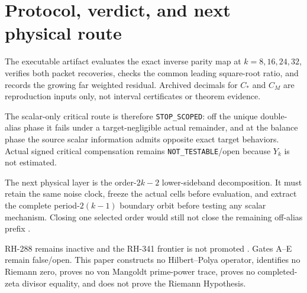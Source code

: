 \documentclass[11pt]{article}
\theoremstyle{remark}
\begin{document}
\section{Protocol, verdict, and next physical route}

The executable artifact evaluates the exact inverse parity map at
$k=8,16,24,32$, verifies both packet recoveries, checks the common leading
square-root ratio, and records the growing far weighted residual.  Archived
decimals for $C_*$ and $C_M$ are reproduction inputs only, not interval
certificates or theorem evidence.

The scalar-only critical route is therefore \texttt{STOP\_SCOPED}: off the
unique double-alias phase it fails under a target-negligible actual remainder,
and at the balance phase the source scalar information admits opposite exact
target behaviors.  Actual signed critical compensation remains
\texttt{NOT\_TESTABLE}/open because $Y_k$ is not estimated.

The next physical layer is the order-$2k-2$ lower-sideband decomposition.  It
must retain the same noise clock, freeze the actual cells before evaluation,
and extract the complete period-$2(k-1)$ boundary orbit before testing any
scalar mechanism.  Closing one selected order would still not close the
remaining off-alias prefix \citep{WangSynchronizedPrefix2026}.

RH-288 remains inactive and the RH-341 frontier is not promoted
\citep{WangActualFrontier2026}.  Gates A--E remain false/open.  This paper
constructs no Hilbert--Polya operator, identifies no Riemann zero, proves no
von Mangoldt prime-power trace, proves no completed-zeta divisor equality,
and does not prove the Riemann Hypothesis.



\end{document}
